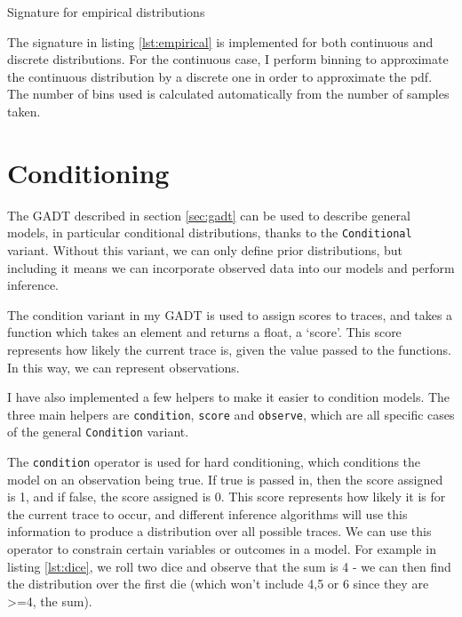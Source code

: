 	
\begin{listing}[ht]
	\caption{Signature for empirical distributions}
	\label{lst:empirical}
\end{listing}
	
The signature in listing \ref{lst:empirical} is implemented for both continuous and discrete distributions. For the continuous case, I perform binning to approximate the continuous distribution by a discrete one in order to approximate the pdf. The number of bins used is calculated automatically from the number of samples taken.
		
\section{Conditioning} \label{sec:condition}
	
The GADT described in section \ref{sec:gadt} can be used to describe general models, in particular conditional distributions, thanks to the \texttt{Conditional} variant. Without this variant, we can only define prior distributions, but including it means we can incorporate observed data into our models and perform inference.
	
The condition variant in my GADT is used to assign scores to traces, and takes a function which takes an element and returns a float, a `score'. This score represents how likely the current trace is, given the value passed to the functions. In this way, we can represent observations.
		
I have also implemented a few helpers to make it easier to condition models. The three main helpers are \texttt{condition}, \texttt{score} and \texttt{observe}, which are all specific cases of the general \texttt{Condition} variant. 
		
The \texttt{condition} operator is used for hard conditioning, which conditions the model on an observation being true. If true is passed in, then the score assigned is 1, and if false, the score assigned is 0. This score represents how likely it is for the current trace to occur, and different inference algorithms will use this information to produce a distribution over all possible traces. We can use this operator to constrain certain variables or outcomes in a model. For example in listing \ref{lst:dice}, we roll two dice and observe that the sum is 4 - we can then find the distribution over the first die (which won't include 4,5 or 6 since they are >=4, the sum).
						
